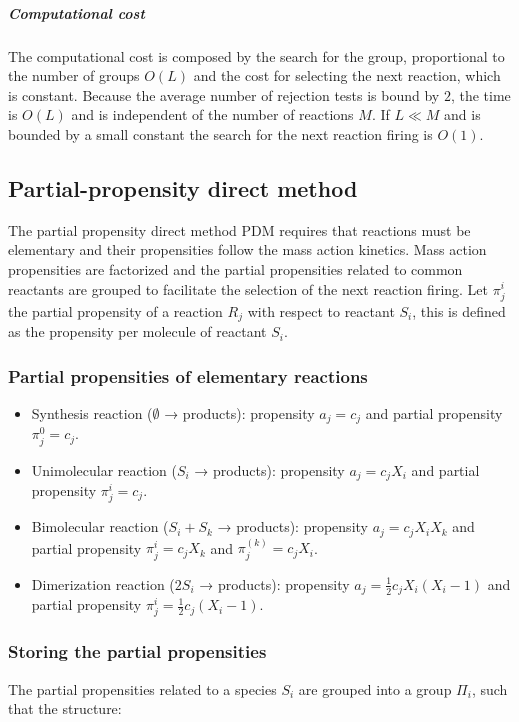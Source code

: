         \subparagraph{Computational cost}
        The computational cost is composed by the search for the group, proportional to the number of groups $O(L)$ and the cost for selecting the next reaction, which is constant.
        Because the average number of rejection tests is bound by $2$, the time is $O(L)$ and is independent of the number of reactions $M$.
        If $L\ll M$ and is bounded by a small constant the search for the next reaction firing is $O(1)$.

  \subsection{Partial-propensity direct method}
  The partial propensity direct method PDM requires that reactions must be elementary and their propensities follow the mass action kinetics.
  Mass action propensities are factorized and the partial propensities related to common reactants are grouped to facilitate the selection of the next reaction firing.
  Let $\pi_j^i$ the partial propensity of a reaction $R_j$ with respect to reactant $S_i$, this is defined as the propensity per molecule of reactant $S_i$.

    \subsubsection{Partial propensities of elementary reactions}

    \begin{itemize}
      \item Synthesis reaction ($\emptyset$ → products): propensity $ a_j =c_j $ and partial propensity $\pi_j^0 = c_j$.
      \item Unimolecular reaction ($ S_i$ → products): propensity $ a_j = c_jX_i $ and partial propensity $\pi_j^i=c_j$.
      \item Bimolecular reaction ($ S_i + S_k$ → products): propensity $ a_j = c_jX_iX_k $ and partial propensity $\pi_j^i = c_jX_k$ and $\pi_j^{(k)} = c_jX_i$.
      \item Dimerization reaction ($2S_i$ → products): propensity $ a_j = \frac{1}{2}c_jX_i(X_i -1) $ and partial propensity $\pi_j^i = \frac{1}{2}c_j(X_i-1)$.
    \end{itemize}

    \subsubsection{Storing the partial propensities}
    The partial propensities related to a species $S_i$ are grouped into  a group $\Pi_i$, such that the structure:

